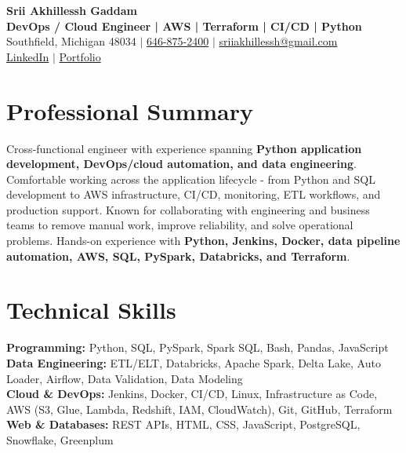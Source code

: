 \documentclass[letterpaper,10pt]{article}
\begin{document}
\fontsize{9.35pt}{10.45pt}\selectfont

\begin{center}
    {\LARGE \textbf{Srii Akhillessh Gaddam}} \\[-1pt]
    \textbf{DevOps / Cloud Engineer | AWS | Terraform | CI/CD | Python} \\[2pt]
    Southfield, Michigan 48034 $|$
    \href{tel:6468752400}{646-875-2400} $|$
    \href{mailto:sriiakhillessh@gmail.com}{sriiakhillessh@gmail.com} \\[1pt]
    \href{https://www.linkedin.com/in/srii-akhiilessh-gaddam-b48668191/}{LinkedIn} $|$
    \href{https://sriiakhillesshg.github.io/portfolio/}{Portfolio}
\end{center}
\vspace{-8pt}

\section{Professional Summary}
\small{Cross-functional engineer with experience spanning \textbf{Python application development, DevOps/cloud automation, and data engineering}. Comfortable working across the application lifecycle - from Python and SQL development to AWS infrastructure, CI/CD, monitoring, ETL workflows, and production support. Known for collaborating with engineering and business teams to remove manual work, improve reliability, and solve operational problems. Hands-on experience with \textbf{Python, Jenkins, Docker, data pipeline automation, AWS, SQL, PySpark, Databricks, and Terraform}.}

\section{Technical Skills}
\small{
\textbf{Programming:} Python, SQL, PySpark, Spark SQL, Bash, Pandas, JavaScript \\
\textbf{Data Engineering:} ETL/ELT, Databricks, Apache Spark, Delta Lake, Auto Loader, Airflow, Data Validation, Data Modeling \\
\textbf{Cloud \& DevOps:} Jenkins, Docker, CI/CD, Linux, Infrastructure as Code, AWS (S3, Glue, Lambda, Redshift, IAM, CloudWatch), Git, GitHub, Terraform \\
\textbf{Web \& Databases:} REST APIs, HTML, CSS, JavaScript, PostgreSQL, Snowflake, Greenplum
}
\end{document}
